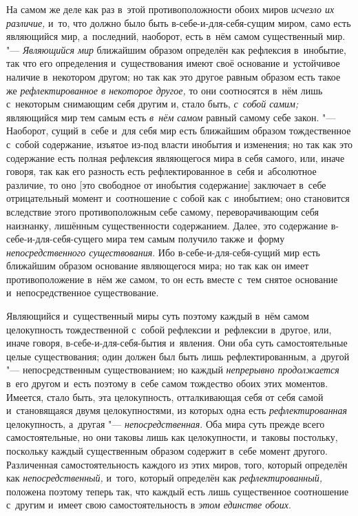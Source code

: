 На самом же деле как раз в~этой противоположности обоих миров
{\em исчезло их различие,} и~то, что должно было быть
в-себе-и-для-себя-сущим миром, само есть являющийся мир, а~последний,
наоборот, есть в~нём самом существенный мир. "---
{\em Являющийся мир} ближайшим образом определён как
рефлексия в~инобытие, так что его определения и~существования имеют своё
основание и~устойчивое наличие в~некотором другом; но так как это другое
равным образом есть такое же {\em рефлектированное в
некоторое другое,} то они соотносятся в~нём лишь с~некоторым снимающим себя
другим и, стало быть, {\em с~собой самим;} являющийся
мир тем самым есть {\em в~нём самом} равный самому себе
закон. "--- Наоборот, сущий в~себе и~для себя мир есть ближайшим образом
тождественное с~собой содержание, изъятое из-под власти инобытия и
изменения; но так как это содержание есть полная рефлексия являющегося мира
в себя самого, или, иначе говоря, так как его разность есть
рефлектированное в~себя и~абсолютное различие, то оно [это свободное от
инобытия содержание] заключает в~себе отрицательный момент и~соотношение с
собой как с~инобытием; оно становится вследствие этого противоположным себе
самому, переворачивающим себя наизнанку, лишённым существенности
содержанием. Далее, это содержание в-себе-и-для-себя-сущего мира тем самым
получило также и~форму {\em непосредственного
существования}. Ибо в-себе-и-для-себя-сущий мир есть ближайшим образом
основание являющегося мира; но так как он имеет противоположение в~нём же
самом, то он есть вместе с~тем снятое основание и~непосредственное
существование.

Являющийся и~существенный миры суть поэтому каждый в~нём самом целокупность
тождественной с~собой рефлексии и~рефлексии в~другое, или, иначе говоря,
в-себе-и-для-себя-бытия и~явления. Они оба суть самостоятельные целые
существования; один должен был быть лишь рефлектированным, а~другой
"--- непосредственным существованием; но каждый
{\em непрерывно продолжается} в~его другом и~есть
поэтому в~себе самом тождество обоих этих моментов. Имеется, стало быть,
эта целокупность, отталкивающая себя от себя самой и~становящаяся двумя
целокупностями, из которых одна есть
{\em рефлектированная} целокупность, а~другая
"--- {\em непосредственная}. Оба мира суть прежде всего
самостоятельные, но они таковы лишь как целокупности, и~таковы постольку,
поскольку каждый существенным образом содержит в~себе момент другого.
Различенная самостоятельность каждого из этих миров, того, который
определён как {\em непосредственный,} и~того, который
определён как {\em рефлектированный,} положена поэтому
теперь так, что каждый есть лишь существенное соотношение с~другим и~имеет
свою самостоятельность в {\em этом единстве обоих}.

